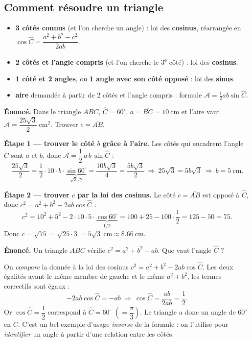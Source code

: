 \documentclass[11pt,a4paper]{article}
\newcommand{\degr}{^{\circ}}
\begin{document}
\subsection{Comment résoudre un triangle}
\begin{methode}
\begin{itemize}[leftmargin=1.6em,topsep=2pt,itemsep=2pt]
  \item \textbf{3 côtés connus} (et l'on cherche un angle) : loi des \textbf{cosinus}, réarrangée en
        $\cos\hat C=\dfrac{a^2+b^2-c^2}{2ab}$.
  \item \textbf{2 côtés et l'angle compris} (et l'on cherche le 3\textsuperscript{e} côté) : loi des
        \textbf{cosinus}.
  \item \textbf{1 côté et 2 angles}, ou \textbf{1 angle avec son côté opposé} : loi des
        \textbf{sinus}.
  \item \textbf{aire} demandée à partir de 2 côtés et l'angle compris : formule
        $\mathcal{A}=\tfrac12 ab\sin\hat C$.
\end{itemize}
\end{methode}

\begin{exemple}
\textbf{Énoncé.} Dans le triangle $ABC$, $\hat C=60\degr$, $a=\overline{BC}=\SI{10}{\centi\metre}$ et
l'aire vaut $\mathcal{A}=\dfrac{25\sqrt3}{2}\ \si{\centi\metre\squared}$. Trouver $c=\overline{AB}$.

\smallskip
\textbf{Étape 1 --- trouver le côté $b$ grâce à l'aire.} Les côtés qui encadrent l'angle $\hat C$
sont $a$ et $b$, donc $\mathcal{A}=\dfrac12\,a\,b\,\sin\hat C$ :
\[
\frac{25\sqrt3}{2}=\frac12\cdot10\cdot b\cdot\underbrace{\sin60\degr}_{\sqrt3/2}
=\frac{10b\sqrt3}{4}=\frac{5b\sqrt3}{2}
\ \Longrightarrow\ 25\sqrt3=5b\sqrt3\ \Longrightarrow\ b=5\ \si{\centi\metre}.
\]

\textbf{Étape 2 --- trouver $c$ par la loi des cosinus.} Le côté $c=\overline{AB}$ est opposé à
$\hat C$, donc $c^2=a^2+b^2-2ab\cos\hat C$ :
\[
c^2=10^2+5^2-2\cdot10\cdot5\cdot\underbrace{\cos60\degr}_{1/2}
=100+25-100\cdot\frac12=125-50=75.
\]
Donc $c=\sqrt{75}=\sqrt{25\cdot3}=5\sqrt3\ \si{\centi\metre}\approx\SI{8.66}{\centi\metre}$.
\end{exemple}

\begin{exemple}
\textbf{Énoncé.} Un triangle $ABC$ vérifie $c^2=a^2+b^2-ab$. Que vaut l'angle $\hat C$ ?

\smallskip
On \emph{compare} la donnée à la loi des cosinus $c^2=a^2+b^2-2ab\cos\hat C$. Les deux égalités
ayant le même membre de gauche et le même $a^2+b^2$, les termes correctifs sont égaux :
\[
-2ab\cos\hat C=-ab\ \Longrightarrow\ \cos\hat C=\frac{ab}{2ab}=\frac12.
\]
Or $\cos\hat C=\dfrac12$ correspond à $\hat C=60\degr$ $\left(=\dfrac{\pi}{3}\right)$. Le triangle a
donc un angle de $\boxed{60\degr}$ en $C$. C'est un bel exemple d'usage \emph{inverse} de la formule :
on l'utilise pour \emph{identifier} un angle à partir d'une relation entre les côtés.
\end{exemple}
\end{document}

